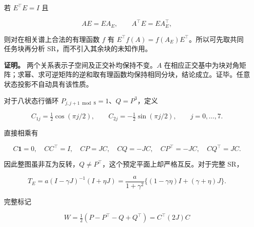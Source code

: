 \documentclass[11pt,a4paper]{article}
\begin{document}
\par
\noindent\begin{minipage}{\linewidth}

若 \(E^\top E=I\) 且

\[
AE=EA_E,\qquad A^\top E=EA_E^\top,
\]

\end{minipage}\par

则对在相关谱上合法的有理函数 \(f\) 有
\(E^\top f(A)=f(A_E)E^\top\)。所以可先取共同任务块再分析
SR，而不引入其余块的未知作用。

\textbf{证明。} 两个关系表示子空间及正交补均保持不变。\(A\)
在相应正交基中为块对角矩阵；求幂、求可逆矩阵的逆和取有理函数均保持相同分块，结论成立。证毕。任意状态投影不自动具有该性质。

\par
\noindent\begin{minipage}{\linewidth}

对于八状态行循环 \(P_{j,j+1\bmod8}=1\)、\(Q=P^3\)，定义

\[
C_{1j}=\tfrac12\cos(\pi j/2),\qquad
C_{2j}=-\tfrac12\sin(\pi j/2),\qquad j=0,\ldots,7.
\]

\end{minipage}\par

\par
\noindent\begin{minipage}{\linewidth}

直接相乘有

\[
C\mathbf1=0,\quad CC^\top=I,\quad
CP=JC,\quad CQ=-JC,\quad
CP^\top=-JC,\quad CQ^\top=JC.
\]

\end{minipage}\par

\par
\noindent\begin{minipage}{\linewidth}

因此整图虽非互为反转，\(Q\ne P^\top\)，这个预定平面上却严格互反。对于完整
SR，

\[
T_E=a(I-\gamma J)^{-1}(I+\eta J)
=\frac{a}{1+\gamma^2}
\{(1-\gamma\eta)I+(\gamma+\eta)J\}.
\]

\end{minipage}\par

\par
\noindent\begin{minipage}{\linewidth}

完整标记

\[
W=\tfrac12(P-P^\top-Q+Q^\top)=C^\top(2J)C
\]

\end{minipage}\par
\end{document}
